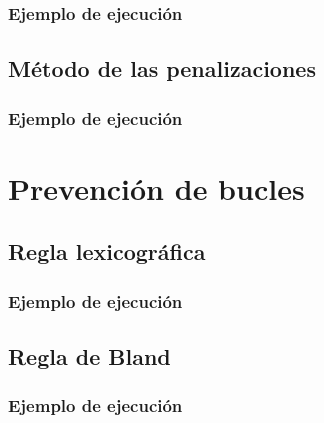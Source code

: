 \subsubsection{Ejemplo de ejecución}
\subsection{Método de las penalizaciones}
\subsubsection{Ejemplo de ejecución}
\section{Prevención de bucles}
\subsection{Regla lexicográfica}
\subsubsection{Ejemplo de ejecución}
\subsection{Regla de Bland}
\subsubsection{Ejemplo de ejecución}